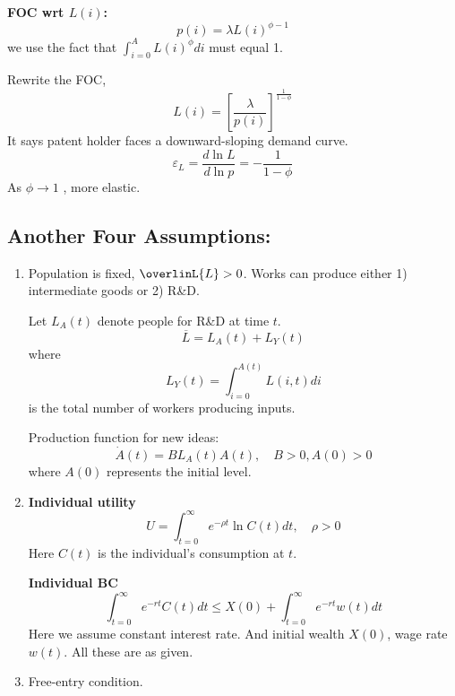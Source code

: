 \documentclass[12pt]{article}
\begin{document}
{{\textbf {FOC wrt $ L(i) $:}}
\begin{equation*}
p(i) = \lambda L(i)^{\phi - 1}
\end{equation*}
we use the fact that $ \int_{i = 0}^{A}L(i)^{\phi}d i  $ must equal 1.

Rewrite the FOC,
\begin{equation*}
L(i) = \left[ \frac{\lambda}{p(i)} \right] ^{\frac{1}{1 - \phi}}
\end{equation*}
It says patent holder faces a downward-sloping demand curve.
\begin{equation*}
\varepsilon_{L} = \frac{d \ln L}{d \ln p} =  - \frac{1}{1 - \phi}
\end{equation*}
As $ \phi \rightarrow 1 $ , more elastic.



\subsection{Another Four Assumptions:}
\begin{enumerate}
\item Population is fixed, $  \overlinL{L} > 0 $. Works can produce either 1)
		intermediate goods or 2) R\&D.

		Let $ L_{A}(t) $ denote people for R\&D at time $ t $.
		\begin{equation*}
		 \overline{L} = L_{A}(t) + L_{Y}(t)
		\end{equation*}
		where 
		\begin{equation*}
		L_{Y}(t) = \int_{i = 0}^{A(t)} L(i,t)d i
		\end{equation*}
		is the total number of workers producing inputs.

		Production function for new ideas:
		\begin{equation*}
		\dot{A}(t) = BL_{A}(t)A(t), \quad B > 0, A(0) > 0
		\end{equation*}
		where $ A(0) $ represents the initial level.
\item {\textbf {Individual utility}}
		\begin{equation*}
		U = \int_{t = 0}^{\infty } e^{ - \rho t}\ln C(t)d t, \quad \rho > 0
		\end{equation*}
		Here $ C(t) $ is the individual's consumption at $ t $.

		{\textbf {Individual BC}}
		\begin{equation*}
		\int_{t = 0}^{\infty } e^{ -r t}C(t)d t \le X(0) + \int_{t = 0}^{\infty } 
		e^{ - r t} w(t)d t
		\end{equation*}
		Here we assume constant interest rate. And initial wealth $ X(0) $, wage rate
		$ w(t) $. All these are as given.
\item Free-entry condition.


\end{enumerate}}
\end{document}

